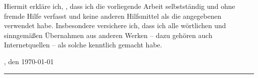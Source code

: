 
Hiermit erkläre ich, \authorName, dass ich die vorliegende Arbeit selbstständig und ohne fremde Hilfe
verfasst und keine anderen Hilfsmittel als die angegebenen verwendet habe.
\br
Insbesondere versichere ich, dass ich alle wörtlichen und sinngemäßen Übernahmen
aus anderen Werken – dazu gehören auch Internetquellen – als solche kenntlich
gemacht habe.
\br[5]

\abgabeOrt, den \today \hspace{0.05cm}
\rule[-0.2cm]{6cm}{0.5pt}
\textsc{\authorName}